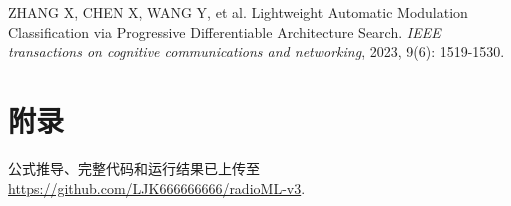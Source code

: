 \documentclass{article}
\begin{document}
\begin{CJK}{UTF8}{gbsn}
\begin{thebibliography}{99}
 ZHANG X, CHEN X, WANG Y, et al. Lightweight Automatic Modulation Classification via Progressive Differentiable Architecture Search. \textit{IEEE transactions on cognitive communications and networking}, 2023, 9(6): 1519-1530.

\end{thebibliography}

\newpage
\section{附录}
公式推导、完整代码和运行结果已上传至\url{https://github.com/LJK666666666/radioML-v3}.

\end{CJK}
\end{document}
